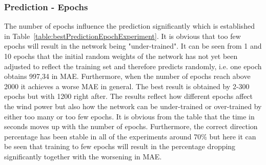 \subsubsection{Prediction - Epochs}
The number of epochs influence the prediction significantly which is established in Table~\ref{table:bestPredictionEpochExperiment}. It is obvious that too few epochs will result in the network being "under-trained". It can be seen from 1 and 10 epochs that the initial random weights of the network has not yet been adjusted to reflect the training set and therefore predicts randomly, i.e. one epoch obtains 997,34 in MAE. Furthermore, when the number of epochs reach above 2000 it achieves a worse MAE in general. The best result is obtained by 2-300 epochs but with 1200 right after. The results reflect how different epochs affect the wind power but also how the network can be under-trained or over-trained by either too many or too few epochs. It is obvious from the table that the time in seconds moves up with the number of epochs. Furthermore, the correct direction percentage has been stable in all of the experiments around 70\% but here it can be seen that training to few epochs will result in the percentage dropping significantly together with the worsening in MAE.


